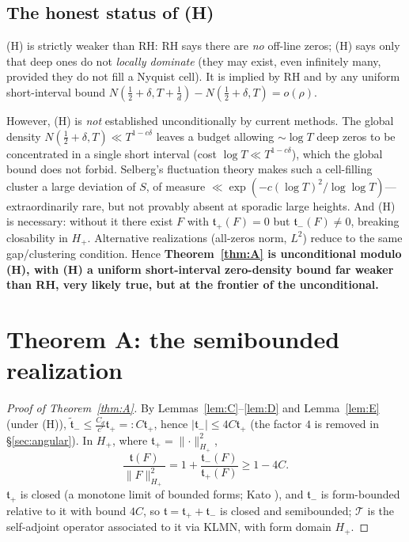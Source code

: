 \documentclass[11pt]{amsart}
\theoremstyle{definition}
\theoremstyle{remark}
\newcommand{\half}{\tfrac12}
\newcommand{\tform}{\mathfrak t}
\newcommand{\tplus}{\mathfrak t_+}
\newcommand{\tminus}{\mathfrak t_-}
\newcommand{\ttilde}{\widetilde{\mathfrak t}_-}
\newcommand{\Hplus}{H_+}
\newcommand{\Top}{\mathcal T}
\newcommand{\Norm}[1]{\lVert #1 \rVert}
\begin{document}
\subsection{The honest status of (H)}\label{sec:Hstatus}
(H) is strictly weaker than RH: RH says there are \emph{no} off-line zeros; (H) says only
that deep ones do not \emph{locally dominate} (they may exist, even infinitely many,
provided they do not fill a Nyquist cell). It is implied by RH and by any uniform
short-interval bound $N(\half+\delta,T+\tfrac1d)-N(\half+\delta,T)=o(\rho)$.

However, (H) is \emph{not} established unconditionally by current methods. The global
density $N(\half+\delta,T)\ll T^{1-c\delta}$ leaves a budget allowing $\sim\log T$ deep
zeros to be concentrated in a single short interval (cost $\log T\ll T^{1-c\delta}$),
which the global bound does not forbid. Selberg's fluctuation theory makes such a
cell-filling cluster a large deviation of $S$, of measure
$\ll\exp(-c(\log T)^{2}/\log\log T)$---extraordinarily rare, but not provably absent at
sporadic large heights. And (H) is necessary: without it there exist $F$ with
$\tplus(F)=0$ but $\tminus(F)\ne0$, breaking closability in $\Hplus$. Alternative
realizations (all-zeros norm, $L^{2}$) reduce to the same gap/clustering condition.
Hence \textbf{Theorem~\ref{thm:A} is unconditional modulo (H), with (H) a uniform
short-interval zero-density bound far weaker than RH, very likely true, but at the
frontier of the unconditional.}

\section{Theorem A: the semibounded realization}\label{sec:thmA}

\begin{proof}[Proof of Theorem~\ref{thm:A}]
By Lemmas~\ref{lem:C}--\ref{lem:D} and Lemma~\ref{lem:E} (under (H)),
$\ttilde\le \tfrac{C_d}{c'}\tplus=:C\tplus$, hence $|\tminus|\le 4C\tplus$ (the factor
$4$ is removed in \S\ref{sec:angular}). In $\Hplus$, where $\tplus=\Norm{\cdot}_{\Hplus}^2$,
\[
\frac{\tform(F)}{\Norm{F}_{\Hplus}^{2}}=1+\frac{\tminus(F)}{\tplus(F)}\ge 1-4C .
\]
$\tplus$ is closed (a monotone limit of bounded forms; Kato \cite{Kato}), and $\tminus$
is form-bounded relative to it with bound $4C$, so $\tform=\tplus+\tminus$ is closed and
semibounded; $\Top$ is the self-adjoint operator associated to it via KLMN, with form
domain $\Hplus$.
\end{proof}
\end{document}
